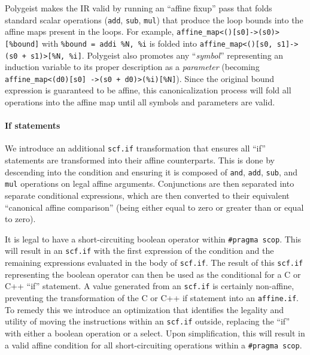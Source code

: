 \documentclass[sigplan]{acmart}
\newcommand{\icode}[1]{{\texttt {#1}}}
\newcommand{\tool}{Polygeist\xspace}
\begin{document}
\tool makes the IR valid by running an ``affine fixup'' pass that folds standard scalar operations (\icode{add}, \icode{sub}, \icode{mul}) that produce the loop bounds into the affine maps present in the loops. 
For example, \icode{affine\_map<()[s0]->(s0)>[\%bound]} with \icode{\%bound = addi \%N, \%i} is folded into \icode{affine\_map<()\xspace[s0, s1]->(s0 + s1)>[\%N, \%i]}. \tool also promotes any ``\emph{symbol}'' representing an induction variable to its proper description as a \emph{parameter} (becoming \icode{affine\_map<(d0)[s0] ->(s0 + d0)>(\%i)[\%N]}).
Since the original bound expression is guaranteed to be affine, this canonicalization process will fold all operations into the affine map until all symbols and parameters are valid.

\paragraph{If statements}
We introduce an additional \icode{scf.if} transformation that ensures all  ``if'' statements are transformed into their affine counterparts. This is done by descending into the condition and ensuring it is composed of \icode{and}, \icode{add}, \icode{sub}, and \icode{mul} operations on legal affine arguments. Conjunctions are then separated into separate conditional expressions, which are then converted to their equivalent ``canonical affine comparison'' (being either equal to zero or greater than or equal to zero).

It is legal to have a short-circuiting boolean operator within \icode{\#pragma scop}. This will result in an \icode{scf.if} with the first expression of the condition and the remaining expressions evaluated in the body of \icode{scf.if}. The result of this \icode{scf.if} representing the boolean operator can then be used as the conditional for a C or C++ ``if'' statement. A value generated from an \icode{scf.if} is certainly non-affine, preventing the transformation of the C or C++ if statement into an \icode{affine.if}. To remedy this we introduce an optimization that identifies the legality and utility of moving the instructions within an \icode{scf.if} outside, replacing the ``if'' with either a boolean operation or a select. Upon simplification, this will result in a valid affine condition for all short-circuiting operations within a \icode{\#pragma scop}.%
\end{document}
